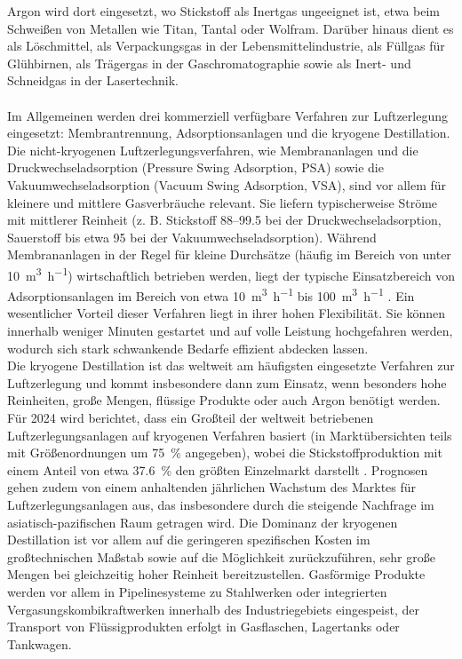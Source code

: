 Argon wird dort eingesetzt, wo Stickstoff als Inertgas ungeeignet ist, etwa beim Schweißen von Metallen wie Titan, Tantal oder Wolfram. Darüber hinaus dient es als Löschmittel, als Verpackungsgas in der Lebensmittelindustrie, als Füllgas für Glühbirnen, als Trägergas in der Gaschromatographie sowie als Inert- und Schneidgas in der Lasertechnik. \cite{nickbockerUllmannsEncyclopediaIndustrial2000, IndustrialGasMarket2025, heinz-wolfgangharingAirGasesNitrogen2007}\\
\\
Im Allgemeinen werden drei kommerziell verfügbare Verfahren zur Luftzerlegung eingesetzt: Membrantrennung, Adsorptionsanlagen und die kryogene Destillation. \\
Die nicht-kryogenen Luftzerlegungsverfahren, wie Membrananlagen und die Druckwechseladsorption (Pressure Swing Adsorption, PSA) sowie die Vakuumwechseladsorption (Vacuum Swing Adsorption, VSA), sind vor allem für kleinere und mittlere Gasverbräuche relevant. Sie liefern typischerweise Ströme mit mittlerer Reinheit (z. B. Stickstoff \SIrange{88}{99,5}{\volpercent} bei der Druckwechseladsorption, Sauerstoff bis etwa \SI{95}{\volpercent} bei der Vakuumwechseladsorption). Während Membrananlagen in der Regel für kleine Durchsätze (häufig im Bereich von unter \SI{10}{\cubic\metre\per\hour}) wirtschaftlich betrieben werden, liegt der typische Einsatzbereich von Adsorptionsanlagen im Bereich von etwa \SI{10}{\cubic\metre\per\hour} bis \SI{100}{\cubic\metre\per\hour} \cite{heinz-wolfgangharingAirGasesNitrogen2007, cornelissenExergyAnalysisCryogenic1998}. Ein wesentlicher Vorteil dieser Verfahren liegt in ihrer hohen Flexibilität. Sie können innerhalb weniger Minuten gestartet und auf volle Leistung hochgefahren werden, wodurch sich stark schwankende Bedarfe effizient abdecken lassen. \cite{heinz-wolfgangharingAirGasesNitrogen2007, cornelissenExergyAnalysisCryogenic1998}\\
Die kryogene Destillation ist das weltweit am häufigsten eingesetzte Verfahren zur Luftzerlegung und kommt insbesondere dann zum Einsatz, wenn besonders hohe Reinheiten, große Mengen, flüssige Produkte oder auch Argon benötigt werden. Für 2024 wird berichtet, dass ein Großteil der weltweit betriebenen Luftzerlegungsanlagen auf kryogenen Verfahren basiert (in Marktübersichten teils mit Größenordnungen um \SI{75}{\percent} angegeben), wobei die Stickstoffproduktion mit einem Anteil von etwa \SI{37,6}{\percent} den größten Einzelmarkt darstellt \cite{AirSeparationUnit2025, ankitguptaAirSeparationUnit}. Prognosen gehen zudem von einem anhaltenden jährlichen Wachstum des Marktes für Luftzerlegungsanlagen aus, das insbesondere durch die steigende Nachfrage im asiatisch-pazifischen Raum getragen wird. Die Dominanz der kryogenen Destillation ist vor allem auf die geringeren spezifischen Kosten im großtechnischen Maßstab sowie auf die Möglichkeit zurückzuführen, sehr große Mengen bei gleichzeitig hoher Reinheit bereitzustellen. Gasförmige Produkte werden vor allem in Pipelinesysteme zu Stahlwerken oder integrierten Vergasungskombikraftwerken innerhalb des Industriegebiets eingespeist, der Transport von Flüssigprodukten erfolgt in Gasflaschen, Lagertanks oder Tankwagen. \cite{lindeengineeringAirSeparationPlants2019} \\

